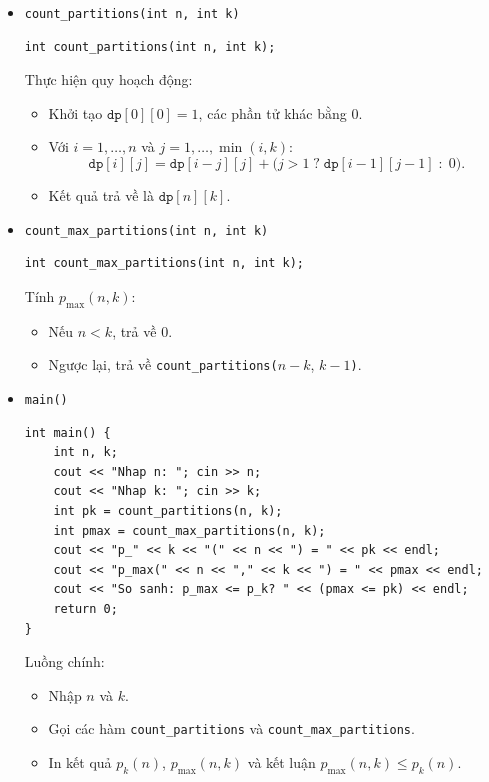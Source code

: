 \documentclass[a4paper,12pt]{article}
\begin{document}
\begin{itemize}

  \item \texttt{count\_partitions(int n, int k)}  
    \begin{lstlisting}[style=cppstyle]
int count_partitions(int n, int k);
    \end{lstlisting}
    Thực hiện quy hoạch động:
    \begin{itemize}
      \item Khởi tạo \(\texttt{dp}[0][0]=1\), các phần tử khác bằng 0.
      \item Với \(i=1,\dots,n\) và \(j=1,\dots,\min(i,k)\):
        \[
          \texttt{dp}[i][j]
            = \texttt{dp}[i-j][j]
            + \bigl(j>1\;?\;\texttt{dp}[i-1][j-1]\;:\;0\bigr).
        \]
      \item Kết quả trả về là \(\texttt{dp}[n][k]\).
    \end{itemize}

  \item \texttt{count\_max\_partitions(int n, int k)}  
    \begin{lstlisting}[style=cppstyle]
int count_max_partitions(int n, int k);
    \end{lstlisting}
    Tính \(p_{\max}(n,k)\):
    \begin{itemize}
      \item Nếu \(n<k\), trả về 0.  
      \item Ngược lại, trả về \texttt{count\_partitions(}\(n-k\), \(k-1\)\texttt{)}.
    \end{itemize}

  \item \texttt{main()}  
    \begin{lstlisting}[style=cppstyle]
int main() {
    int n, k;
    cout << "Nhap n: "; cin >> n;
    cout << "Nhap k: "; cin >> k;
    int pk = count_partitions(n, k);
    int pmax = count_max_partitions(n, k);
    cout << "p_" << k << "(" << n << ") = " << pk << endl;
    cout << "p_max(" << n << "," << k << ") = " << pmax << endl;
    cout << "So sanh: p_max <= p_k? " << (pmax <= pk) << endl;
    return 0;
}
    \end{lstlisting}
    Luồng chính:
    \begin{itemize}
      \item Nhập \(n\) và \(k\).  
      \item Gọi các hàm \texttt{count\_partitions} và \texttt{count\_max\_partitions}.  
      \item In kết quả \(p_k(n)\), \(p_{\max}(n,k)\) và kết luận \(p_{\max}(n,k)\le p_k(n)\).
    \end{itemize}

\end{itemize}
\end{document}
